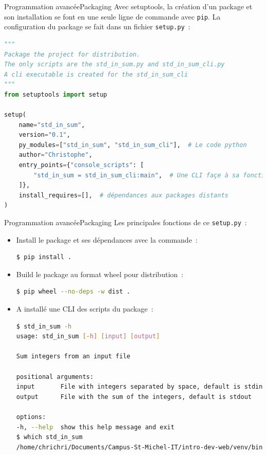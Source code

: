 \documentclass{beamer}
\begin{document}
    \begin{frame}[fragile]{Programmation avancée}{Packaging}
        Avec setuptools, la création d'un package et son installation se font en une seule ligne de commande avec \lstinline{pip}.
        \bigbreak
        La configuration du package se fait dans un fichier \lstinline{setup.py}~:
        \begin{lstlisting}[language=Python]
"""
Package the project for distribution.
The only scripts are the std_in_sum.py and std_in_sum_cli.py
A cli executable is created for the std_in_sum_cli
"""
from setuptools import setup

setup(
    name="std_in_sum",
    version="0.1",
    py_modules=["std_in_sum", "std_in_sum_cli"],  # Le code python
    author="Christophe",
    entry_points={"console_scripts": [
        "std_in_sum = std_in_sum_cli:main",  # Une CLI façe à sa fonction main
    ]},
    install_requires=[],  # dépendances aux packages distants
)
        \end{lstlisting}
    \end{frame}

    \begin{frame}[fragile]{Programmation avancée}{Packaging}
        Les principales fonctions de ce \lstinline{setup.py}~:
        \begin{itemize}
            \item Install le package et ses dépendances avec la commande~:
            \begin{lstlisting}[language=bash,basicstyle=\tiny\ttfamily]
$ pip install .
            \end{lstlisting}
            \item Build le package au format wheel pour distribution~:
            \begin{lstlisting}[language=bash,basicstyle=\tiny\ttfamily]
$ pip wheel --no-deps -w dist .
            \end{lstlisting}
            \item A installé une CLI des scripts du package~:
            \begin{lstlisting}[language=Bash,basicstyle=\tiny\ttfamily]
$ std_in_sum -h
usage: std_in_sum [-h] [input] [output]

Sum integers from an input file

positional arguments:
input       File with integers separated by space, default is stdin
output      File with the sum of the integers, default is stdout

options:
-h, --help  show this help message and exit
$ which std_in_sum
/home/chrichri/Documents/Campus-St-Michel-IT/intro-dev-web/venv/bin/std_in_sum
            \end{lstlisting}
        \end{itemize}
    \end{frame}
\end{document}
